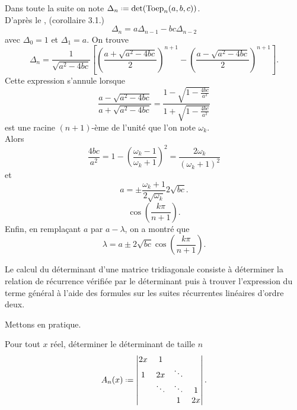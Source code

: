 \begin{preuve}
    Dans toute la suite on note $\Delta_n \defeq \det(\mathrm{Toep}_n(a,b,c))$. \\
    D'après le , (corollaire 3.1.)
    $$\Delta_n = a \Delta_{n-1} - bc \Delta_{n-2}$$
    avec $\Delta_0 = 1$ et $\Delta_1 = a$.
    On trouve 
    $$\Delta_n = \frac{1}{\sqrt{a^2 - 4bc}} \left[ \left( \frac{a + \sqrt{a^2 - 4bc}}{2} \right)^{n+1} - \left( \frac{a - \sqrt{a^2 - 4bc}}{2} \right)^{n+1} \right].$$
    Cette expression s'annule lorsque 
    $$\frac{a - \sqrt{a^2 - 4bc}}{a + \sqrt{a^2 - 4bc}} = \frac{1 - \sqrt{1 - \frac{4bc}{a^2}}}{1 + \sqrt{1 - \frac{4bc}{a^2}}}$$
    est une racine $(n+1)$-ème de l'unité que l'on note $\omega_k$. \\
    Alors
    $$\frac{4bc}{a^2} = 1 - \left( \frac{\omega_k - 1}{\omega_k + 1} \right)^2 = \frac{2 \omega_k}{(\omega_k + 1)^2}$$
    et 
    $$a = \pm \frac{\omega_k + 1}{2 \sqrt{\omega_k}}2 \sqrt{bc}.$$
    $$\cos \left(\frac{k \pi}{n+1}\right).$$
    Enfin, en remplaçant $a$ par $a - \lambda$, on a montré que
    $$\lambda =a \pm 2 \sqrt{bc} \cos \left( \frac{k \pi}{n+1} \right).$$
\end{preuve}

\begin{methode}
    Le calcul du déterminant d'une matrice tridiagonale consiste à déterminer la relation de récurrence vérifiée par le déterminant puis à trouver l'expression du terme général à l'aide des formules sur les suites récurrentes linéaires d'ordre deux. 
\end{methode}

Mettons en pratique.

\begin{exercice}
Pour tout $x$ réel, déterminer le déterminant de taille $n$
    $$
        A_n(x) \defeq \begin{vmatrix}
            2x & 1 & & \\
            1 & 2x & \ddots\\
            & \ddots & \ddots & 1\\
            & & 1 & 2x
        \end{vmatrix}.
    $$   
\end{exercice}

